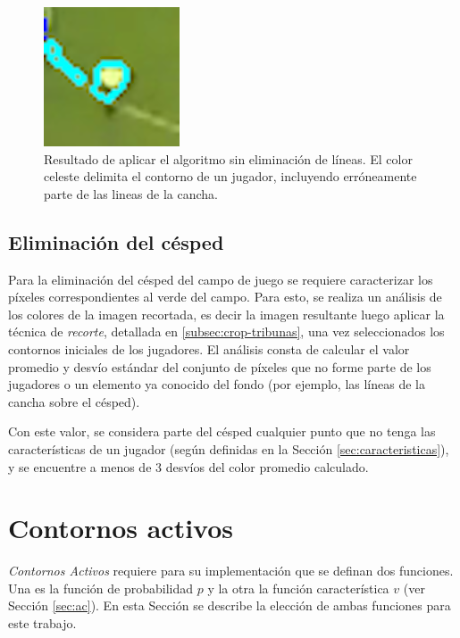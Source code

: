 \begin{figure}[H]
  \centering
  \includegraphics[width=0.3\linewidth]{./images/confusion-linea.png}
  \caption{ Resultado de aplicar el algoritmo sin eliminación de líneas.
    El color celeste delimita el contorno de un jugador, incluyendo erróneamente
    parte de las lineas de la cancha.}
      \label{fig:confusion-linea}
\end{figure}

\subsection{Eliminación del césped}
\label{sec:cesped}

Para la eliminación del césped del campo de juego se requiere caracterizar los
píxeles correspondientes al verde del campo. Para esto, se realiza un análisis
de los colores de la imagen recortada, es decir la imagen resultante luego
aplicar la técnica de \textit{recorte}, detallada en
\ref{subsec:crop-tribunas}, una vez seleccionados los contornos iniciales de
los jugadores. El análisis consta de calcular el valor promedio y desvío
estándar del conjunto de píxeles que no forme parte de los jugadores o un
elemento ya conocido del fondo (por ejemplo, las líneas de la cancha sobre el
césped).

Con este valor, se considera parte del césped cualquier punto que no tenga las
características de un jugador (según definidas en la Sección
\ref{sec:caracteristicas}), y se encuentre a menos de $3$ desvíos del color
promedio calculado.

\section{Contornos activos} \label{sec:ac-extension}

\textit{Contornos Activos} requiere para su implementación que se definan dos
funciones. Una es la función de probabilidad $p$ y la otra la función
característica $v$ (ver Sección \ref{sec:ac}). En esta Sección se describe la
elección de ambas funciones para este trabajo.

